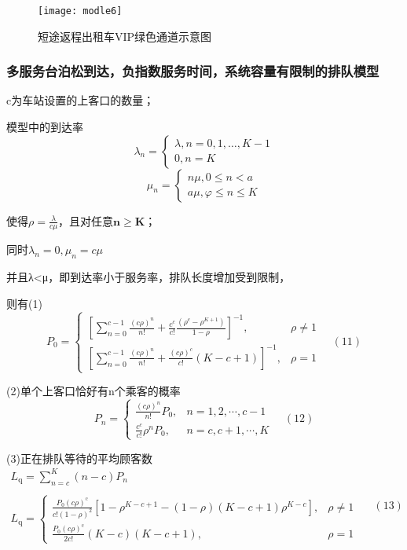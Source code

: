 \documentclass[withoutpreface,bwprint]{cumcmthesis} %
\begin{document}
\begin{figure}[!h]
	\centering
	\texttt{[image: modle6]}
	\caption{短途返程出租车VIP绿色通道示意图}
	\label{fig:circuit-diagram}
\end{figure}

\subsubsection{多服务台泊松到达，负指数服务时间，系统容量有限制的排队模型}
c为车站设置的上客口的数量；

模型中的到达率
$$
\lambda_{n}=\left\{\begin{array}{c}{\lambda, n=0,1, \ldots, K-1} \\ {0, n=K}\end{array}\right.
$$
$$
\mu_{n}=\left\{\begin{array}{l}{n \mu, 0 \leq n<a} \\ {a \mu, \varphi \leq n \leq K}\end{array}\right.
$$

使得$\rho=\frac{\lambda}{c \mu}$，且对任意$\mathbf{n} \geq \mathbf{K}$；

同时$\lambda_{n}=0, \mu_{n}=c \mu$

并且λ<μ，即到达率小于服务率，排队长度增加受到限制，

则有(1)
$$
P_{0}=\left\{\begin{array}{ll}{\left[\sum_{n=0}^{c-1} \frac{(c \rho)^{n}}{n !}+\frac{c^{c}}{c !} \frac{\left(\rho^{c}-\rho^{K+1}\right)}{1-\rho}\right]^{-1},} & {\rho \neq 1} \\ {\left[\sum_{n=0}^{c-1} \frac{(c \rho)^{n}}{n !}+\frac{(c \rho)^{c}}{c !}(K-c+1)\right]^{-1},} & {\rho=1}\end{array}\right. \quad(11)
$$

(2)单个上客口恰好有n个乘客的概率
$$
P_{n}=\left\{\begin{array}{ll}{\frac{(c \rho)^{n}}{n !} P_{0},} & {n=1,2, \cdots, c-1} \\ {\frac{c^{c}}{c !} \rho^{n} P_{0},} & {n=c, c+1, \cdots, K}\end{array}\right. \quad(12)
$$

(3)正在排队等待的平均顾客数
$$
\begin{array}{c}{L_{\mathrm{q}}=\sum_{n=c}^{K}(n-c) P_{n}} \\ \\ {L_{\mathrm{q}}=\left\{\begin{array}{ll}{\frac{P_{0}(c \rho)^{\mathrm{c}}}{c !(1-\rho)^{2}}\left[1-\rho^{K-c+1}-(1-\rho)(K-c+1) \rho^{K-c}\right],} & {\rho \neq 1} \\ {\frac{P_{0}(c \rho)^{\mathrm{c}}}{2 c !}(K-c)(K-c+1),} & {\rho=1}\end{array}\right.}\end{array} \quad(13)
$$
\end{document}

